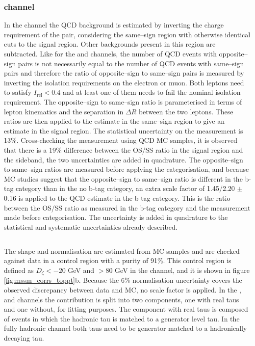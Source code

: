 \subsubsection{\texorpdfstring{\emu channel}{e mu channel}}
\label{sec:mssm_bkgs_qcd_em}
In the \emu channel the QCD background
is estimated by inverting the charge requirement
of the pair, considering the same--sign region
with otherwise identical cuts to the signal region.
Other backgrounds present in this region are subtracted.
Like for the \etau and \mutau channels, the number of
QCD events with opposite--sign \emu pairs is not
necessarily equal to the number of QCD events
with same--sign \emu pairs and therefore the ratio
of opposite--sign to same--sign pairs is measured by inverting
the isolation requirements on the electron or muon. Both
leptons need to satisfy $I_{\text{rel}} < 0.4$ and at 
least one of them needs to fail the nominal isolation requirement.
The opposite--sign to same--sign ratio is parameterised in terms
of lepton kinematics and the separation in $\Delta R$ between the
two leptons. These ratios are then applied to the estimate in the same--sign region
to give an estimate in the signal region. The statistical uncertainty
on the measurement is 13\%. Cross-checking the measurement 
using QCD \ac{MC} samples, it is observed that there is a 19\% difference
between the OS/SS ratio in the signal region and the sideband, the two
uncertainties are added in quadrature. 
The opposite--sign to same--sign ratios are measured
before applying the categorisation, and because \ac{MC} studies suggest
that the opposite--sign to same--sign ratio is different in the b-tag
category than in the no b-tag category, an extra scale factor of 
1.45/2.20 $\pm$ 0.16 is applied to the QCD estimate in the b-tag category. This is 
the ratio between the OS/SS ratio as measured in the b-tag category and 
the measurement made before categorisation. The uncertainty is added in
quadrature to the statistical and systematic uncertainties already described.


\subsection{\texorpdfstring{\ttbar}{ttbar}}
\label{sec:mssm_bkgs_tt}
The \ttbar shape and normalisation are estimated from \ac{MC} 
samples and are checked against data in a control
region with a \ttbar purity of 91\%. This control region
is defined as $D_{\zeta} < -20$ GeV and \MET $>80$ GeV in 
the \emu channel, and it is shown in figure \ref{fig:mssm_corrs_toppt}b.
Because the 6\%
\ttbar normalisation uncertainty covers the observed
discrepancy between data and \ac{MC}, no scale factor is applied.
In the \mutau, \etau and \tautau channels
the \ttbar contribution is split into
two components, one with real taus and 
one without, for fitting purposes. The component with real taus is composed
of \ttbar events in which the hadronic tau is matched
to a generator level tau. In the fully hadronic channel
both taus need to be generator matched to a hadronically
decaying tau.



